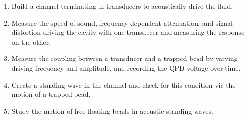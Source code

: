 \begin{enumerate}

\item Build a channel terminating in transducers to acoustically drive the fluid.

\item Measure the speed of sound, frequency-dependent attenuation, and signal distortion driving the cavity with one transducer and measuring the response on the other.

\item Measure the coupling between a transducer and a trapped bead by varying driving frequency and amplitude, and recording the QPD voltage over time.

\item Create a standing wave in the channel and check for this condition via the motion of a trapped bead.

\item Study the motion of free floating beads in acoustic standing waves.

\end{enumerate}
~
~
~









